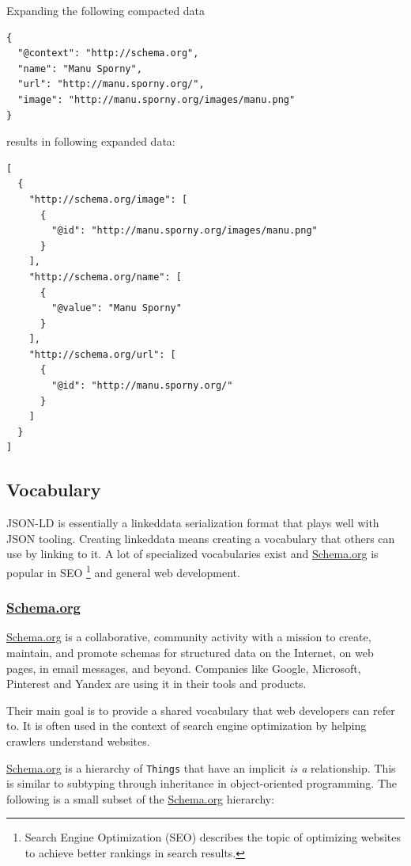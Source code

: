 Expanding the following compacted data

\lstset{language=JSON}
\begin{lstlisting}[caption=Compacted and easy-to-read data of a person.]
{
  "@context": "http://schema.org",
  "name": "Manu Sporny",
  "url": "http://manu.sporny.org/",
  "image": "http://manu.sporny.org/images/manu.png"
}
\end{lstlisting}

results in following expanded data:

\lstset{language=JSON}
\begin{lstlisting}[caption=Expanded data of a person that is easy to process for machines.]
[
  {
    "http://schema.org/image": [
      {
        "@id": "http://manu.sporny.org/images/manu.png"
      }
    ],
    "http://schema.org/name": [
      {
        "@value": "Manu Sporny"
      }
    ],
    "http://schema.org/url": [
      {
        "@id": "http://manu.sporny.org/"
      }
    ]
  }
]
\end{lstlisting}

\subsection{Vocabulary}
JSON-LD is essentially a \gls{linkeddata} serialization format that plays well with JSON tooling. Creating \gls{linkeddata} means creating a vocabulary that others can use by linking to it. A lot of specialized vocabularies exist and \url{Schema.org} is popular in SEO \footnote{Search Engine Optimization (SEO) describes the topic of optimizing websites to achieve better rankings in search results.} and general web development.

\subsubsection{\url{Schema.org}}\label{schemaorg}
\url{Schema.org} is a collaborative, community activity with a mission to create, maintain, and promote schemas for structured data on the Internet, on web pages, in email messages, and beyond. \citep{welcomeschemaorg} Companies like Google, Microsoft, Pinterest and Yandex are using it in their tools and products.

Their main goal is to provide a shared vocabulary that web developers can refer to. It is often used in the context of search engine optimization by helping crawlers understand websites.

\url{Schema.org} is a hierarchy of \lstinline{Things} that have an implicit \textit{is a} relationship. This is similar to subtyping through inheritance in object-oriented programming. The following is a small subset of the \url{Schema.org} hierarchy:

